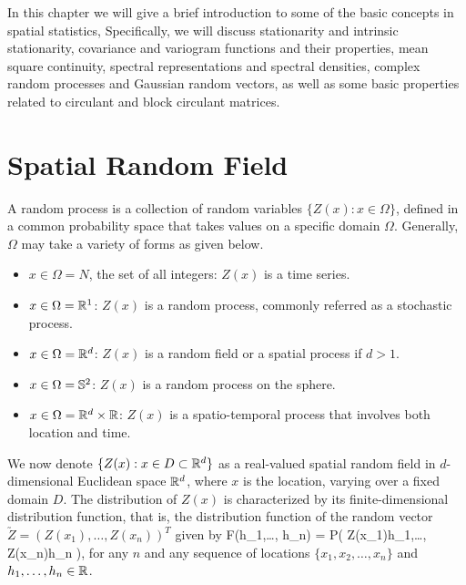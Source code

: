 

%

In this chapter we will give a brief introduction to some of the basic concepts in spatial statistics, Specifically, we will discuss stationarity and intrinsic stationarity, covariance and variogram functions and their properties, mean square continuity, spectral representations and spectral densities, complex random processes and Gaussian random vectors, as well as some basic properties related to circulant and block circulant matrices.   %

\section{Spatial Random Field}
A random process is a collection of random variables $\{Z(x): x \in \Omega\}$, defined in a common probability space that takes values on a specific domain $\Omega$. Generally, $\Omega$ may take a variety of forms as given below.

\begin{itemize}
	\item $x \in \Omega =  N$, the set of all integers: $Z(x)$ is a time series.
	\item $x \in \Omega = \mathbb{R}^1$: $Z(x)$ is a random process, commonly referred as a stochastic process.
	\item $x \in \Omega = \mathbb{R}^d$: $Z(x)$ is a random field or a spatial process if $d > 1$.
	\item $x \in \Omega = \mathbb{S}^2$: $Z(x)$ is a random process on the sphere.
	\item $x \in \Omega = \mathbb{R}^d\times \mathbb{R}$: $Z(x)$ is a spatio-temporal process that involves both location and time.
\end{itemize}

We now denote $\{Z(x): x \in D \subset \mathbb{R}^d\}$ as a real-valued spatial random field in $d$-dimensional Euclidean space $\mathbb{R}^d$, where $x$ is the location, varying over a fixed domain $D$. The distribution of $Z(x)$ is characterized by its finite-dimensional distribution function, that is, the distribution function of the random vector $ \utilde{Z}=(Z(x_1),\ldots, Z(x_n) )^{T}$ given by
\beq
F(h_1,\ldots, h_n) = P( Z(x_1)\le h_1,\ldots, Z(x_n)\le h_n ),
\eeq
for any $n$ and any sequence of locations $\{x_1, x_2, \ldots, x_n\}$ and $h_1,\ldots, h_n \in \mathbb{R}$.


